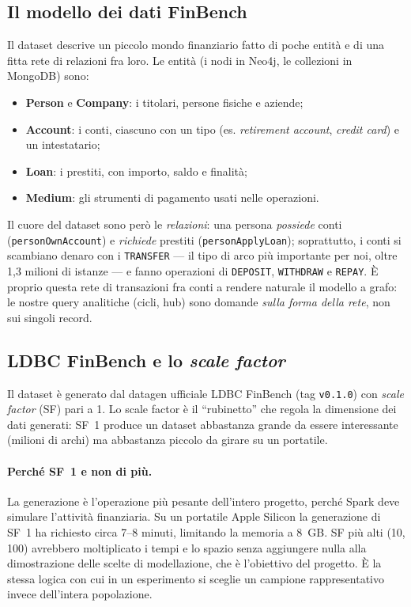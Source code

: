 \documentclass[11pt,a4paper]{article}
\begin{document}
\subsection{Il modello dei dati FinBench}

Il dataset descrive un piccolo mondo finanziario fatto di poche entit\`a e di una
fitta rete di relazioni fra loro. Le entit\`a (i nodi in Neo4j, le collezioni in
MongoDB) sono:
\begin{itemize}[nosep]
  \item \textbf{Person} e \textbf{Company}: i titolari, persone fisiche e aziende;
  \item \textbf{Account}: i conti, ciascuno con un tipo (es. \emph{retirement
  account}, \emph{credit card}) e un intestatario;
  \item \textbf{Loan}: i prestiti, con importo, saldo e finalit\`a;
  \item \textbf{Medium}: gli strumenti di pagamento usati nelle operazioni.
\end{itemize}
Il cuore del dataset sono per\`o le \emph{relazioni}: una persona \emph{possiede}
conti (\texttt{personOwnAccount}) e \emph{richiede} prestiti
(\texttt{personApplyLoan}); soprattutto, i conti si scambiano denaro con i
\texttt{TRANSFER} --- il tipo di arco pi\`u importante per noi, oltre 1,3 milioni
di istanze --- e fanno operazioni di \texttt{DEPOSIT}, \texttt{WITHDRAW} e
\texttt{REPAY}. \`E proprio questa rete di transazioni fra conti a rendere
naturale il modello a grafo: le nostre query analitiche (cicli, hub) sono
domande \emph{sulla forma della rete}, non sui singoli record.

\subsection{LDBC FinBench e lo \emph{scale factor}}

Il dataset \`e generato dal datagen ufficiale LDBC FinBench (tag
\texttt{v0.1.0}) con \emph{scale factor} (SF) pari a 1. Lo scale factor \`e il
``rubinetto'' che regola la dimensione dei dati generati: SF~1 produce un dataset
abbastanza grande da essere interessante (milioni di archi) ma abbastanza piccolo
da girare su un portatile.

\paragraph{Perch\'e SF~1 e non di pi\`u.} La generazione \`e l'operazione pi\`u
pesante dell'intero progetto, perch\'e Spark deve simulare l'attivit\`a
finanziaria. Su un portatile Apple Silicon la generazione di SF~1 ha richiesto
circa 7--8 minuti, limitando la memoria a 8~GB. SF pi\`u alti (10, 100) avrebbero
moltiplicato i tempi e lo spazio senza aggiungere nulla alla dimostrazione delle
scelte di modellazione, che \`e l'obiettivo del progetto. \`E la stessa logica
con cui in un esperimento si sceglie un campione rappresentativo invece
dell'intera popolazione.
\end{document}
